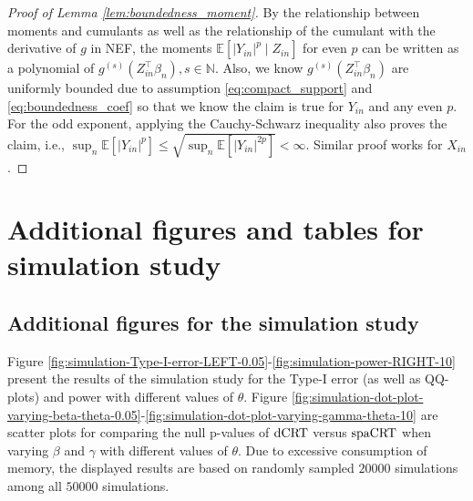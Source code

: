 \documentclass[12pt]{article}
\theoremstyle{definition}
\newcommand{\E}{\mathbb E}								%
\newcommand{\srx}{X}									%
\newcommand{\srz}{Z}									%
\newcommand{\sry}{Y}									%
\newcommand{\dCRT}{\textnormal{dCRT}} 					%
\newcommand{\spacrt}{\textnormal{spaCRT}}               %
\begin{document}
\begin{proof}[Proof of Lemma \ref{lem:boundedness_moment}]
  By the relationship between moments and cumulants as well as the relationship of the cumulant with the derivative of $g$ in NEF, the moments $\E[|\sry_{in}|^p\mid \srz_{in}]$ for even $p$ can be written as a polynomial of $g^{(s)}(\srz_{in}^\top\beta_n),s\in\mathbb{N}$. Also, we know $g^{(s)}(\srz_{in}^\top\beta_n)$ are uniformly bounded due to assumption \eqref{eq:compact_support} and \eqref{eq:boundedness_coef} so that we know the claim is true for $\sry_{in}$ and any even $p$. For the odd exponent, applying the Cauchy-Schwarz inequality also proves the claim, i.e., $\sup_n\E[|\sry_{in}|^p]\leq \sqrt{\sup_n\E[|\sry_{in}|^{2p}]}<\infty$. Similar proof works for $\srx_{in}$.
\end{proof}





\section{Additional figures and tables for simulation study}\label{sec:additional_figure_table_simulation}

\subsection{Additional figures for the simulation study}\label{sec:additional_figure_simulation}

{\color{red}
Figure \ref{fig:simulation-Type-I-error-LEFT-0.05}-\ref{fig:simulation-power-RIGHT-10} present the results of the simulation study for the Type-I error (as well as QQ-plots) and power with different values of $\theta$. Figure \ref{fig:simulation-dot-plot-varying-beta-theta-0.05}-\ref{fig:simulation-dot-plot-varying-gamma-theta-10} are scatter plots for comparing the null p-values of $\dCRT$ versus $\spacrt$ when varying $\beta$ and $\gamma$ with different values of $\theta$. Due to excessive consumption of memory, the displayed results are based on randomly sampled $20000$ simulations among all $50000$ simulations.
}
\end{document}
